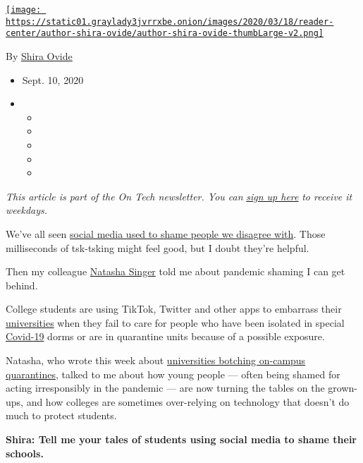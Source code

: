 \href{https://www.nytimes3xbfgragh.onion/by/shira-ovide}{\texttt{[image: https://static01.graylady3jvrrxbe.onion/images/2020/03/18/reader-center/author-shira-ovide/author-shira-ovide-thumbLarge-v2.png]}}

By \href{https://www.nytimes3xbfgragh.onion/by/shira-ovide}{Shira Ovide}

\begin{itemize}
\item
  Sept. 10, 2020
\item
  \begin{itemize}
  \item
  \item
  \item
  \item
  \item
  \end{itemize}
\end{itemize}

\emph{This article is part of the On Tech newsletter. You can}
\href{https://www.nytimes3xbfgragh.onion/newsletters/signup/OT}{\emph{sign
up here}} \emph{to receive it weekdays.}

We've all seen
\href{https://www.nytimes3xbfgragh.onion/2020/05/11/arts/social-distance-shaming.html}{social
media used to shame people we disagree with}. Those milliseconds of
tsk-tsking might feel good, but I doubt they're helpful.

Then my colleague
\href{https://www.nytimes3xbfgragh.onion/by/natasha-singer}{Natasha
Singer} told me about pandemic shaming I can get behind.

College students are using TikTok, Twitter and other apps to embarrass
their
\href{https://www.nytimes3xbfgragh.onion/2020/09/10/health/university-illinois-covid.html}{universities}
when they fail to care for people who have been isolated in special
\href{https://www.nytimes3xbfgragh.onion/2020/09/10/health/university-illinois-covid.html}{Covid-19}
dorms or are in quarantine units because of a possible exposure.

Natasha, who wrote this week about
\href{https://www.nytimes3xbfgragh.onion/2020/09/09/business/colleges-coronavirus-dormitories-quarantine.html}{universities
botching on-campus quarantines}, talked to me about how young people ---
often being shamed for acting irresponsibly in the pandemic --- are now
turning the tables on the grown-ups, and how colleges are sometimes
over-relying on technology that doesn't do much to protect students.

\textbf{Shira: Tell me your tales of students using social media to
shame their schools.}

